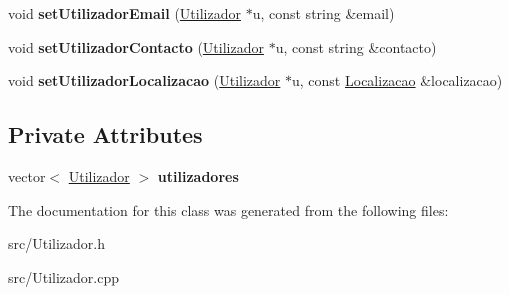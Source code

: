 \begin{DoxyCompactItemize}
\item 
\hypertarget{class_utilizadores_a2f6d319078c2e9bf239ea3f083ff9220}{}void {\bfseries set\+Utilizador\+Email} (\hyperlink{class_utilizador}{Utilizador} $\ast$u, const string \&email)\label{class_utilizadores_a2f6d319078c2e9bf239ea3f083ff9220}

\item 
\hypertarget{class_utilizadores_aa9d1435806f416b423b87f579e934b36}{}void {\bfseries set\+Utilizador\+Contacto} (\hyperlink{class_utilizador}{Utilizador} $\ast$u, const string \&contacto)\label{class_utilizadores_aa9d1435806f416b423b87f579e934b36}

\item 
\hypertarget{class_utilizadores_a1cb74d603746df6f22f13857ca3e2de0}{}void {\bfseries set\+Utilizador\+Localizacao} (\hyperlink{class_utilizador}{Utilizador} $\ast$u, const \hyperlink{class_localizacao}{Localizacao} \&localizacao)\label{class_utilizadores_a1cb74d603746df6f22f13857ca3e2de0}

\end{DoxyCompactItemize}
\subsection*{Private Attributes}
\begin{DoxyCompactItemize}
\item 
\hypertarget{class_utilizadores_a31edb33f251127dda192239b7b10be8e}{}vector$<$ \hyperlink{class_utilizador}{Utilizador} $>$ {\bfseries utilizadores}\label{class_utilizadores_a31edb33f251127dda192239b7b10be8e}

\end{DoxyCompactItemize}


The documentation for this class was generated from the following files\+:\begin{DoxyCompactItemize}
\item 
src/Utilizador.\+h\item 
src/Utilizador.\+cpp\end{DoxyCompactItemize}
